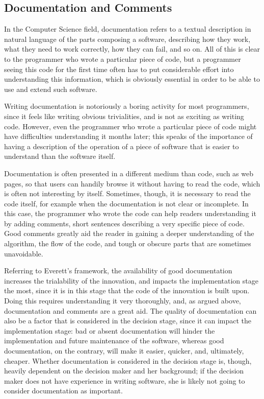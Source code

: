 \documentclass[12pt]{article}
\begin{document}
\subsection{Documentation and Comments}
\label{sec:org12bc45f}
In the Computer Science field, documentation refers to a textual description in natural language of the parts composing a software, describing how they work, what they need to work correctly, how they can fail, and so on. All of this is clear to the programmer who wrote a particular piece of code, but a programmer seeing this code for the first time often has to put considerable effort into understanding this information, which is obviously essential in order to be able to use and extend such software.

Writing documentation is notoriously a boring activity for most programmers, since it feels like writing obvious trivialities, and is not as exciting as writing code. However, even the programmer who wrote a particular piece of code might have difficulties understanding it months later; this speaks of the importance of having a description of the operation of a piece of software that is easier to understand than the software itself.

Documentation is often presented in a different medium than code, such as web pages, so that users can handily browse it without having to read the code, which is often not interesting by itself. Sometimes, though, it is necessary to read the code itself, for example when the documentation is not clear or incomplete. In this case, the programmer who wrote the code can help readers understanding it by adding comments, short sentences describing a very specific piece of code. Good comments greatly aid the reader in gaining a deeper understanding of the algorithm, the flow of the code, and tough or obscure parts that are sometimes unavoidable.

Referring to Everett's framework, the availability of good documentation increases the trialability of the innovation, and impacts the implementation stage the most, since it is in this stage that the code of the innovation is built upon. Doing this requires understanding it very thoroughly, and, as argued above, documentation and comments are a great aid. The quality of documentation can also be a factor that is considered in the decision stage, since it can impact the implementation stage: bad or absent documentation will hinder the implementation and future maintenance of the software, whereas good documentation, on the contrary, will make it easier, quicker, and, ultimately, cheaper. Whether documentation is considered in the decision stage is, though, heavily dependent on the decision maker and her background; if the decision maker does not have experience in writing software, she is likely not going to consider documentation as important.
\end{document}
